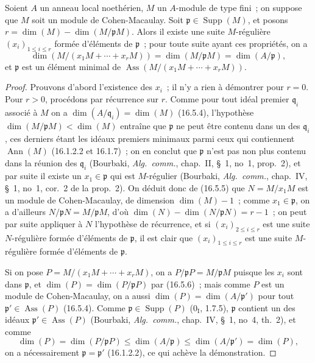 \begin{proposition}[16.5.9]
\label{0.16.5.9-fr}
Soient $A$ un anneau local noethérien, $M$ un $A$-module de type fini~; on
suppose que $M$ soit un module de Cohen-Macaulay. Soit
$\mathfrak{p}\in\operatorname{Supp}(M)$, et posons
$r=\dim(M)-\dim(M/\mathfrak{p}M)$. Alors il existe une suite $M$-régulière
$(x_i)_{1\leq i\leq r}$ formée d'éléments de $\mathfrak{p}$~; pour toute
suite ayant ces propriétés, on a
\[
  \dim(M/(x_1M+\cdots+x_rM))
  =\dim(M/\mathfrak{p}M)=\dim(A/\mathfrak{p}),
\]
et $\mathfrak{p}$ est un élément minimal de
$\operatorname{Ass}(M/(x_1M+\cdots+x_rM))$.
\end{proposition}

\begin{proof}
Prouvons d'abord l'existence des $x_i$~; il n'y a rien à démontrer pour
$r=0$. Pour $r>0$, procédons par récurrence sur $r$. Comme pour tout idéal
premier $\mathfrak{q}_i$ associé à $M$ on a
$\dim(A/\mathfrak{q}_i)=\dim(M)$ (16.5.4), l'hypothèse
$\dim(M/\mathfrak{p}M)<\dim(M)$ entraîne que $\mathfrak{p}$ ne peut être
contenu dans un des $\mathfrak{q}_i$, ces derniers étant les idéaux premiers
minimaux parmi ceux qui contiennent $\operatorname{Ann}(M)$ (16.1.2.2 et
16.1.7)~; on en conclut que $\mathfrak{p}$ n'est pas non plus contenu dans la
réunion des $\mathfrak{q}_i$ (Bourbaki, \emph{Alg.~comm.}, chap.~II, \S~1,
no~1, prop.~2), et par suite il existe un $x_1\in\mathfrak{p}$ qui est
$M$-régulier (Bourbaki, \emph{Alg.~comm.}, chap.~IV, \S~1, no~1, cor.~2 de
la prop.~2). On déduit donc de (16.5.5) que $N=M/x_1M$ est un module de
Cohen-Macaulay, de dimension $\dim(M)-1$~; comme $x_1\in\mathfrak{p}$, on a
d'ailleurs $N/\mathfrak{p}N=M/\mathfrak{p}M$, d'où
$\dim(N)-\dim(N/\mathfrak{p}N)=r-1$~; on peut par suite appliquer à $N$
l'hypothèse de récurrence, et si $(x_i)_{2\leq i\leq r}$ est une suite
$N$-régulière formée d'éléments de $\mathfrak{p}$, il est clair que
$(x_i)_{1\leq i\leq r}$ est une suite $M$-régulière formée d'éléments de
$\mathfrak{p}$.

Si on pose $P=M/(x_1M+\cdots+x_rM)$, on a
$P/\mathfrak{p}P=M/\mathfrak{p}M$ puisque les $x_i$ sont dans
$\mathfrak{p}$, et $\dim(P)=\dim(P/\mathfrak{p}P)$ par (16.5.6)~; mais comme
$P$ est un module de Cohen-Macaulay, on a aussi
$\dim(P)=\dim(A/\mathfrak{p}')$ pour tout
$\mathfrak{p}'\in\operatorname{Ass}(P)$ (16.5.4). Comme
$\mathfrak{p}\in\operatorname{Supp}(P)$ ($0_{\mathrm I}$, 1.7.5),
$\mathfrak{p}$ contient un des idéaux
$\mathfrak{p}'\in\operatorname{Ass}(P)$ (Bourbaki, \emph{Alg.~comm.},
chap.~IV, \S~1, no~4, th.~2), et comme
\[
  \dim(P)=\dim(P/\mathfrak{p}P)
  \leq\dim(A/\mathfrak{p})
  \leq\dim(A/\mathfrak{p}')=\dim(P),
\]
on a nécessairement $\mathfrak{p}=\mathfrak{p}'$ (16.1.2.2), ce qui achève
la démonstration.
\end{proof}


